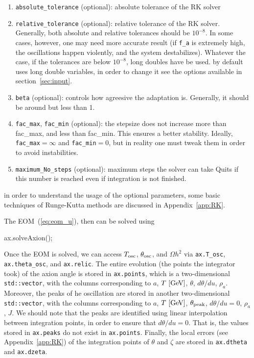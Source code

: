 \documentclass[11pt,a4paper]{article}
\begin{document}
\begin{enumerate}
	\item {\tt absolute\_tolerance} (optional): absolute tolerance of the RK solver
	
	\item {\tt relative\_tolerance} (optional): relative tolerance of the RK solver.
	Generally, both absolute and relative tolerances should be $10^{-8}$. 
	In some cases, however, one may need more accurate result (\eg if {\tt f\_a} is extremely high, 
	the oscillations happen violently, and the system destabilizes). Whatever the case, if the  
	tolerances are below $10^{-8}$, long doubles have be used. \mimes by default uses {long double} variables, 
	in order to change it see the options available in section~\ref{sec:input}.
	
	\item {\tt beta} (optional): controls how agreesive the adaptation is. Generally, it should be around but less than 1.
	
	\item {\tt fac\_max},  {\tt fac\_min} (optional): the stepsize does not increase more than fac\_max, and less than fac\_min. 
	This ensures a better stability. Ideally, {\tt fac\_max}$=\infty$ and {\tt fac\_min}$=0$, but in reality one must 
	tweak them in order to avoid instabilities.
	
	\item {\tt maximum\_No\_steps} (optional): maximum steps the solver can take Quits if this number is reached even if integration
	is not finished. 
\end{enumerate}
%
in order to understand the usage of the optional parameters, some basic techniques of Runge-Kutta methods are discussed in Appendix~\ref{app:RK}. 

The EOM~(\ref{eq:eom_u}), then can be solved using 
%
\begin{cpp}
	ax.solveAxion();
\end{cpp}
%
Once the EOM is solved, we can access $T_{\rm osc}{}$, $\theta_{\rm osc}{}$, and $\Omega h^2$  via {\tt ax.T\_osc}, {\tt ax.theta\_osc}, and {\tt ax.relic}. The entire evolution (the points the integrator took) of the axion angle is stored in {\tt ax.points}, which is a two-dimensional {\tt std::vector}, with the columns corresponding to  $a$, $T~[{\rm GeV}]$, 
$\theta$, $d\theta/du$, $\rho_a$. Moreover, the peaks of he oscillation are stored in another two-dimensional {\tt std::vector}, with the columns corresponding to $a$, $T~[{\rm GeV}]$, $\theta_{\rm peak}{}$, $d\theta/du=0$, $\rho_a$, $J$. We should note that the peaks are identified using linear interpolation between integration points, in order to ensure that $d\theta/du = 0$. That is, the values stored in {\tt ax.peaks} do not exist in {\tt ax.points}. Finally, the local errors (see Appendix~\ref{app:RK}) of the integration points of $\theta$ and $\zeta$ are stored in {\tt ax.dtheta} and {\tt ax.dzeta}.
\end{document}
